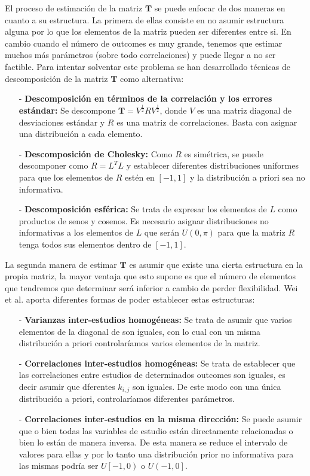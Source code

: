 \documentclass[a4paper,openright,12pt]{report}
\begin{document}
El proceso de estimación de la matriz $\mathbf{T}$ se puede enfocar de dos maneras en cuanto a su estructura\cite{Wei2013}\cite{Mavridis2011}. La primera de ellas consiste en no asumir estructura alguna por lo que los elementos de la matriz pueden ser diferentes entre si. En cambio cuando el número de outcomes es muy grande, tenemos que estimar muchos más parámetros (sobre todo correlaciones) y puede llegar a no ser factible. Para intentar solventar este problema se han desarrollado técnicas de descomposición de la matriz $\mathbf{T}$ como alternativa:
\begin{itemize}
\item[-] \textbf{Descomposición en términos de la correlación y los errores estándar:} Se descompone $\mathbf{T}=V^{\frac{1}{2}}RV^{\frac{1}{2}}$, donde $V$ es una matriz diagonal de desviaciones estándar y $R$ es una matriz de correlaciones. Basta con asignar una distribución a cada elemento.
\item[-] \textbf{Descomposición de Cholesky:} Como $R$ es simétrica, se puede descomponer como $R=L^{T}L$ y establecer diferentes distribuciones uniformes para que los elementos de $R$ estén en $\left[-1,1\right]$ y la distribución a priori sea no informativa.
\item[-] \textbf{Descomposición esférica:} Se trata de expresar los elementos de $L$ como productos de senos y cosenos. Es necesario asignar distribuciones no informativas a los elementos de $L$ que serán $U(0,\pi)$ para que la matriz $R$ tenga todos sus elementos dentro de $\left[-1,1\right]$.
\end{itemize}

La segunda manera de estimar $\mathbf{T}$ es asumir que existe una cierta estructura en la propia matriz, la mayor ventaja que esto supone es que el número de elementos que tendremos que determinar será inferior a cambio de perder flexibilidad. Wei et al. aporta diferentes formas de poder establecer estas estructuras:
\begin{itemize}
\item[-] \textbf{Varianzas inter-estudios homogéneas:} Se trata de asumir que varios elementos de la diagonal de  son iguales, con lo cual con un misma distribución a priori controlaríamos varios elementos de la matriz.
\item[-] \textbf{Correlaciones inter-estudios homogéneas:} Se trata de establecer que las correlaciones entre estudios de determinados outcomes son iguales, es decir asumir que dferentes $k_{i,j}$ son iguales. De este modo con una única distribución a priori, controlaríamos diferentes parámetros.
\item[-] \textbf{Correlaciones inter-estudios en la misma dirección:} Se puede asumir que o bien todas las variables de estudio están directamente relacionadas o bien lo están de manera inversa. De esta manera se reduce el intervalo de valores para ellas y por lo tanto una distribución prior no informativa para las mismas podría ser $U\left[-1,0\right)$ o $U\left(-1,0\right]$. 
\end{itemize}
\end{document}
